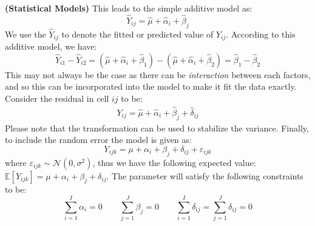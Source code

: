 \begin{remark}{\textbf{(Statistical Models)}}
    This leads to the simple additive model as:
    \begin{equation*}
        \hat{Y}_{ij} = \hat{\mu} + \hat{\alpha}_i + \hat{\beta}_j
    \end{equation*}
    We use the $\hat{Y}_{ij}$ to denote the fitted or predicted value of $Y_{ij}$. According to this additive model, we have:
    \begin{equation*}
        \hat{Y}_{i1} - \hat{Y}_{i2} = (\hat{\mu} + \hat{\alpha}_i + \hat{\beta}_1) - (\hat{\mu} + \hat{\alpha}_i + \hat{\beta}_2) = \hat{\beta}_1 - \hat{\beta}_2
    \end{equation*}
    This may not always be the case as there can be \emph{interaction} between each factors, and so this can be incorporated into the model to make it fit the data exactly. Consider the residual in cell $ij$ to be:
    \begin{equation*}
    \begin{aligned}
        Y_{ij} = \hat{\mu} + \hat{\alpha}_i + \hat{\beta}_j + \hat{\delta}_{ij}
    \end{aligned}
    \end{equation*}
    Please note that the transformation can be used to stabilize the variance. Finally, to include the random error the model is given as:
    \begin{equation*}
        Y_{ijk} = \mu + \alpha_i + \beta_j + \delta_{ij} + \varepsilon_{ijk}
    \end{equation*}
    where $\varepsilon_{ijk} \sim \mathcal{N}(0, \sigma^2)$, thus we have the following expected value: $\mathbb{E}[Y_{ijk}] = \mu + \alpha_i + \beta_j + \delta_{ij}$. The parameter will satisfy the following constraints to be:
    \begin{equation*}
        \sum^I_{i=1}\alpha_i = 0 \qquad \sum^J_{j=1}\beta_j = 0 \qquad \sum^I_{i=1}\delta_{ij} = \sum^J_{j=1}\delta_{ij} = 0
    \end{equation*}
\end{remark}

